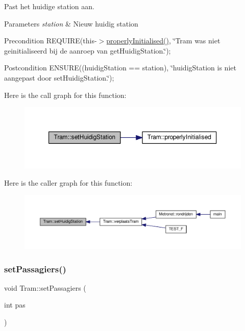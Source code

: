 Past het huidige station aan. 


\begin{DoxyParams}{Parameters}
{\em station} & Nieuw huidig station \\
\hline
\end{DoxyParams}
\begin{DoxyPrecond}{Precondition}
R\+E\+Q\+U\+I\+RE(this-\/$>$\hyperlink{class_tram_ac2688f590e4db232b4f535c9bf959efb}{properly\+Initialised()}, \char`\"{}\+Tram was niet geinitialiseerd bij de aanroep van get\+Huidig\+Station.\char`\"{}); 
\end{DoxyPrecond}
\begin{DoxyPostcond}{Postcondition}
E\+N\+S\+U\+RE((huidig\+Station == station), \char`\"{}huidig\+Station is niet aangepast door set\+Huidig\+Station.\char`\"{}); 
\end{DoxyPostcond}
Here is the call graph for this function\+:\nopagebreak
\begin{figure}[H]
\begin{center}
\leavevmode
\includegraphics[width=350pt]{class_tram_ad8627700455e2d24563e08a72d887197_cgraph}
\end{center}
\end{figure}
Here is the caller graph for this function\+:\nopagebreak
\begin{figure}[H]
\begin{center}
\leavevmode
\includegraphics[width=350pt]{class_tram_ad8627700455e2d24563e08a72d887197_icgraph}
\end{center}
\end{figure}
\mbox{\label{class_tram_a3454b4b012930b02eff8fd22b7d9428a}} 
\subsubsection{\texorpdfstring{set\+Passagiers()}{setPassagiers()}}
{\footnotesize\ttfamily void Tram\+::set\+Passagiers (\begin{DoxyParamCaption}\item[{int}]{pas }\end{DoxyParamCaption})}




